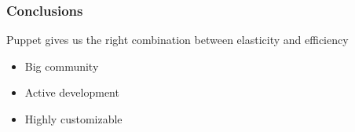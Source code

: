 \documentclass[aspectratio=169]{beamer}
\begin{document}

\begin{frame}
    \frametitle{Conclusions}
    Puppet gives us the right combination between elasticity and efficiency \\

    \begin{itemize}
        \item Big community
        \item Active development
        \item Highly customizable
    \end{itemize}

\end{frame}


\cernSplashBlue
\end{document}
